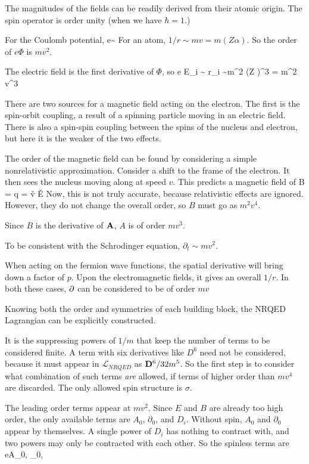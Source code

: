 The magnitudes of the fields can be readily derived from their atomic origin.  The spin operator is order unity (when we have $\hbar=1$.)

For the Coulomb potential, 
\beq
	e\Phi \sim {}
\eeq
For an atom, $1/r \sim mv = m (Z\alpha)$.  So the order of $e\Phi$ is $mv^2$.

The electric field is the first derivative of $\Phi$, so 
\beq
	e E_i \sim {} r_i \sim m^2 (Z \alpha)^3 = m^2 v^3
\eeq

There are two sources for a magnetic field acting on the electron. The first is the spin-orbit coupling, a result of a spinning particle moving in an electric field.  There is also a spin-spin coupling between the spins of the nucleus and electron, but here it is the weaker of the two effects.

The order of the magnetic field can be found by considering a simple nonrelativistic approximation.  Consider a shift to the frame of the electron.  It then sees the nucleus moving along at speed $v$.  This predicts a magnetic field of 
\beq
	B = q   = \v{v} \times \v{E} 
\eeq
Now, this is not truly accurate, because relativistic effects are ignored.  However, they do not change the overall order, so $B$ must go as $m^2v^4$.

Since $B$ is the derivative of $\mathbf{A}$, $A$ is of order $mv^3$.

To be consistent with the Schrodinger equation, $\partial_t \sim mv^2$.

When acting on the fermion wave functions, the spatial derivative will bring down a factor of $p$.  Upon the electromagnetic fields, it gives an overall $1/r$.  In both these cases, $\mathbf{\partial}$ can be considered to be of order $mv$



Knowing both the order and symmetries of each building block, the NRQED Lagrangian can be explicitly constructed.

It is the suppressing powers of $1/m$ that keep the number of terms to be considered finite.  A term with six derivatives like $D^6$ need not be considered, because it must appear in $\mathcal{L}_{NRQED}$ as $\mathbf{D}^6 / 32m^5$.  So the first step is to consider what combination of such terms {\it are} allowed, if terms of higher order than $mv^4$ are discarded.  The only allowed spin structure is $\sigma$.

The leading order terms appear at $mv^2$.  Since $E$ and $B$ are already too high order, the only available terms are $A_0$, $\partial_0$, and $D_i$.  
Without spin, $A_0$ and $\partial_0$ appear by themselves.  A single power of $D_i$ has nothing to contract with, and two powers may only be contracted with each other.  So the spinless terms are
\beq
	eA_0, \;  \partial_0,  \; 
\eeq

